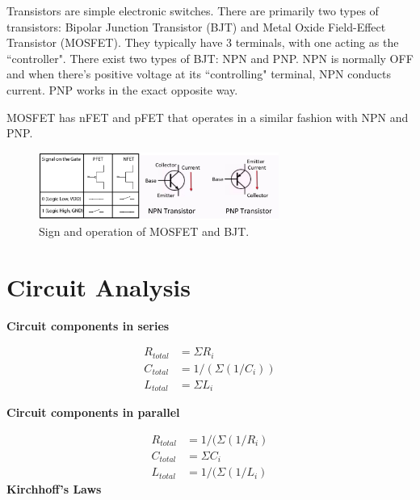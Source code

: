 \documentclass{article}
\begin{document}
Transistors are simple electronic switches. There are primarily two types of transistors: Bipolar Junction Transistor (BJT) and Metal Oxide Field-Effect Transistor (MOSFET). They typically have 3 terminals, with one acting as the ``controller". There exist two types of BJT: NPN and PNP. NPN is normally OFF and when there's positive voltage at its ``controlling" terminal, NPN conducts current. PNP works in the exact opposite way. \par
MOSFET has nFET and pFET that operates in a similar fashion with NPN and PNP.

\begin{figure}[!h]
	\center
	\includegraphics[width=0.7\textwidth, keepaspectratio]{transistor}
	\caption{Sign and operation of MOSFET and BJT.}
	\label{fig:transistor}
\end{figure}

\section{Circuit Analysis}

\textbf{\large{Circuit components in series}}\par

\begin{equation}
\begin{split}
	R_{total} & = \Sigma R_i\\
	C_{total} & = 1/(\Sigma(1/C_i))\\
	L_{total} & = \Sigma L_i
\end{split}
\end{equation}

\textbf{\large{Circuit components in parallel}}\par

\begin{equation}
\begin{split}
	R_{total} & = 1/(\Sigma (1/R_i)\\
	C_{total} & = \Sigma C_i\\
	L_{total} & = 1/(\Sigma (1/L_i)
\end{split}
\end{equation}
\newpage
\textbf{\large{Kirchhoff's Laws}}\par
\end{document}
